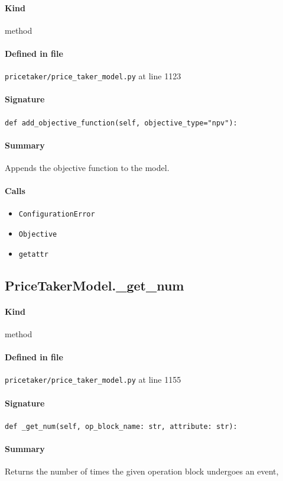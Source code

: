 \documentclass[11pt]{report}
\begin{document}
\paragraph{Kind} method
\paragraph{Defined in file} \texttt{pricetaker/price\_taker\_model.py} at line 1123
\paragraph{Signature} \texttt{def add\_objective\_function(self, objective\_type="npv"):}
\paragraph{Summary} Appends the objective function to the model.
\paragraph{Calls}
\begin{itemize}[leftmargin=*]
  \item \texttt{ConfigurationError}
  \item \texttt{Objective}
  \item \texttt{getattr}
\end{itemize}
\subsection{PriceTakerModel.\_get\_num}
\label{def:pricetaker-price_taker_model.py:PriceTakerModel._get_num:L1155}
\paragraph{Kind} method
\paragraph{Defined in file} \texttt{pricetaker/price\_taker\_model.py} at line 1155
\paragraph{Signature} \texttt{def \_get\_num(self, op\_block\_name: str, attribute: str):}
\paragraph{Summary} Returns the number of times the given operation block undergoes an event,
\end{document}
